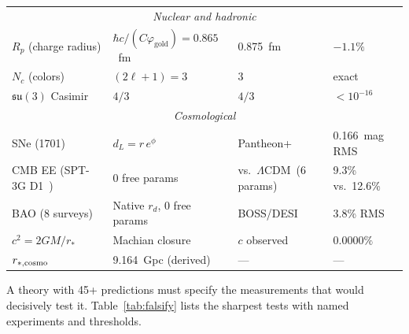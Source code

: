 \documentclass[aps,prd,twocolumn,superscriptaddress,nofootinbib,longbibliography]{revtex4-2}
\newcommand{\rstar}{r_{*}}
\newcommand{\vgold}{\varphi_{\mathrm{gold}}}
\begin{document}
\begin{table}[t]
\begin{ruledtabular}
\begin{tabular}{llll}
\multicolumn{4}{c}{\textit{Nuclear and hadronic}} \\[3pt]
$R_p$ (charge radius) & $\hbar c/(C\vgold) = 0.865$~fm
  & 0.875~fm & $-1.1\%$ \\
$N_c$ (colors) & $(2\ell+1) = 3$ & $3$ & exact \\
$\mathfrak{su}(3)$ Casimir & $4/3$ & $4/3$ & $< 10^{-16}$ \\[6pt]
\multicolumn{4}{c}{\textit{Cosmological}} \\[3pt]
SNe (1701) & $d_L = r\,e^{\phi}$
  & Pantheon+ & 0.166~mag RMS \\
CMB EE (SPT-3G D1~\cite{SPT3GD1}) & 0 free params
  & vs.\ $\Lambda$CDM~(6 params) & 9.3\% vs.\ 12.6\% \\
BAO (8 surveys) & Native $r_d$, 0 free params
  & BOSS/DESI & 3.8\% RMS \\
$c^2 = 2GM/\rstar$ & Machian closure
  & $c$ observed & $0.0000\%$ \\
$r_{*,\rm cosmo}$ & 9.164~Gpc (derived) & --- & --- \\
\end{tabular}
\end{ruledtabular}
\end{table}
\endgroup

A theory with 45+ predictions must specify the measurements that
would decisively test it.  Table~\ref{tab:falsify} lists the
sharpest tests with named experiments and thresholds.
\end{document}
